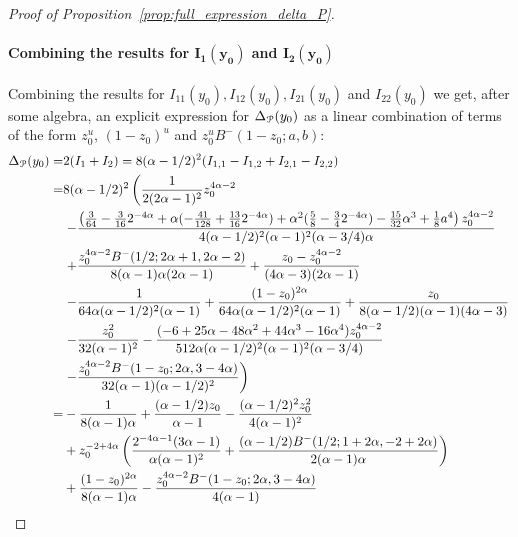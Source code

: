 \begin{proof}[Proof of Proposition~\ref{prop:full_expression_delta_P}]
\paragraph{Combining the results for $\bm{I_1(y_0)}$ and $\bm{I_2(y_0)}$}

Combining the results for $I_{11}(y_0), I_{12}(y_0), I_{21}(y_0)$ and $I_{22}(y_0)$ we get, after some algebra, an explicit expression for $\Delta_{{\mathcal P}}(y_0)$ as a linear combination of terms of the form $z_0^u$, $(1-z_0)^u$ and $z_0^u B^-(1-z_0;a,b)$: 
\begin{align*}
\Delta_{{\mathcal P}}(y_0)=& 2(I_1+I_2) = 8(\alpha- 1/2)^2(I_{1,1}-I_{1,2}+I_{2,1}-I_{2,2}) \\
=&8(\alpha-1/2)^2 \left(\frac{1}{2(2\alpha-1)^2 }z_0^{4\alpha -2} \right. \\ 
&\left.-\frac{\left(\frac{3}{64}- \frac{3}{16} 2^{-4\alpha}+ 
   \alpha (-\frac{41}{128} + \frac{13}{16}  2^{-4\alpha})  + 
   \alpha^2 (\frac{5}{8} - \frac{3}{4} 2^{-4\alpha}) - \frac{15}{32}\alpha^3 +\frac{1}{8} a^4   \right) z_0^{4 \alpha-2} }{4(\alpha-1/2)^2 (\alpha-1)^2 (\alpha-3/4) \alpha} \right. \\ 
&\left.+\frac{z_0^{4\alpha-2}B^-(1/2; 2\alpha+1, 2\alpha-2) }{8 (\alpha-1) \alpha (2\alpha-1)} +\frac{z_0 - z_0^{4\alpha -2}}{(4\alpha-3)(2\alpha-1)} \right.\\
&\left.-\frac{1}{64\alpha(\alpha-1/2)^2(\alpha-1)} +\frac{(1 - z_0)^{2\alpha}}{64\alpha(\alpha-1/2)^2 (\alpha-1)} +\frac{z_0}{8(\alpha-1/2)(\alpha-1)(4\alpha-3)} \right.\\
   &\left. - \frac{z_0^2}{32(\alpha-1)^2}
   - \frac{(-6 + 25\alpha - 48\alpha^2 + 44\alpha^3 -16\alpha^4) z_0^{4\alpha-2}}{512\alpha(\alpha-1/2)^2(\alpha-1)^2(\alpha-3/4)} \right. \\
   & \left. - \frac{z_0^{4\alpha-2}B^-(1 - z_0; 2\alpha, 3 - 4\alpha)}{32(\alpha-1)(\alpha-1/2)^2} \right) \\
=&-\frac{1}{8 (\alpha - 1) \alpha} + \frac{(\alpha - 1/2) z_0}{\alpha - 1} - \frac{(\alpha - 1/2)^2 z_0^2}{
	4 (\alpha - 1)^2} \\
&+ 
z_0^{-2 + 4 \alpha} \left(\frac{2^{-4 \alpha-1} (3 \alpha - 1)}{\alpha (\alpha - 1)^2} + \frac{(\alpha - 
	1/2 ) B^-(1/2; 1 + 2 \alpha, 
	-2 + 2 \alpha)}{2(\alpha - 1) \alpha} \right) \\
&+ \frac{(1 - 
	z_0)^{2 \alpha}}{8 (\alpha - 1) \alpha} - \frac{  
	z_0^{4 \alpha - 2} B^-(1 - z_0; 2 \alpha, 3 - 4 \alpha)}{4 (\alpha - 1)}
\end{align*}


\end{proof}
